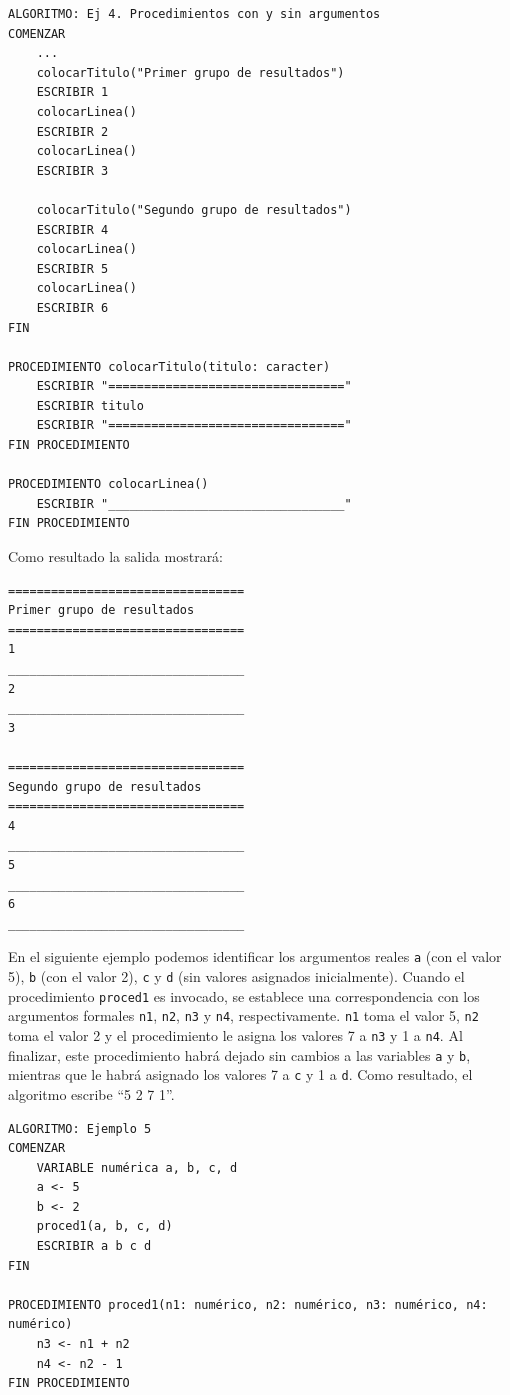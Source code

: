 \documentclass[]{book}
\begin{document}
\begin{verbatim}
ALGORITMO: Ej 4. Procedimientos con y sin argumentos
COMENZAR
    ...
    colocarTitulo("Primer grupo de resultados")
    ESCRIBIR 1
    colocarLinea()
    ESCRIBIR 2
    colocarLinea()
    ESCRIBIR 3

    colocarTitulo("Segundo grupo de resultados")
    ESCRIBIR 4
    colocarLinea()
    ESCRIBIR 5
    colocarLinea()
    ESCRIBIR 6
FIN

PROCEDIMIENTO colocarTitulo(titulo: caracter)
    ESCRIBIR "================================="
    ESCRIBIR titulo
    ESCRIBIR "================================="
FIN PROCEDIMIENTO

PROCEDIMIENTO colocarLinea()
    ESCRIBIR "_________________________________"
FIN PROCEDIMIENTO
\end{verbatim}

Como resultado la salida mostrará:

\begin{verbatim}
=================================
Primer grupo de resultados
=================================
1
_________________________________
2
_________________________________
3

=================================
Segundo grupo de resultados
=================================
4
_________________________________
5
_________________________________
6
_________________________________
\end{verbatim}

En el siguiente ejemplo podemos identificar los argumentos reales \texttt{a} (con el valor 5), \texttt{b} (con el valor 2), \texttt{c} y \texttt{d} (sin valores asignados inicialmente). Cuando el procedimiento \texttt{proced1} es invocado, se establece una correspondencia con los argumentos formales \texttt{n1}, \texttt{n2}, \texttt{n3} y \texttt{n4}, respectivamente. \texttt{n1} toma el valor 5, \texttt{n2} toma el valor 2 y el procedimiento le asigna los valores 7 a \texttt{n3} y 1 a \texttt{n4}. Al finalizar, este procedimiento habrá dejado sin cambios a las variables \texttt{a} y \texttt{b}, mientras que le habrá asignado los valores 7 a \texttt{c} y 1 a \texttt{d}. Como resultado, el algoritmo escribe ``5 2 7 1''.

\begin{verbatim}
ALGORITMO: Ejemplo 5
COMENZAR
    VARIABLE numérica a, b, c, d
    a <- 5
    b <- 2
    proced1(a, b, c, d)
    ESCRIBIR a b c d
FIN

PROCEDIMIENTO proced1(n1: numérico, n2: numérico, n3: numérico, n4: numérico)
    n3 <- n1 + n2
    n4 <- n2 - 1
FIN PROCEDIMIENTO
\end{verbatim}
\end{document}
